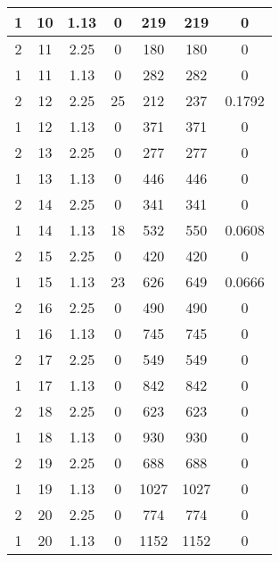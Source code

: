\documentclass[letterpaper, 12pt]{article}
\begin{document}
\begin{longtable}{|c|c|c|c|c|c|c|}
\hline
1 & 10 & 1.13 & 0 & 219 & 219 & 0 \\
\hline
2 & 11 & 2.25 & 0 & 180 & 180 & 0 \\
\hline
1 & 11 & 1.13 & 0 & 282 & 282 & 0 \\
\hline
2 & 12 & 2.25 & 25 & 212 & 237 & 0.1792 \\
\hline
1 & 12 & 1.13 & 0 & 371 & 371 & 0 \\
\hline
2 & 13 & 2.25 & 0 & 277 & 277 & 0 \\
\hline
1 & 13 & 1.13 & 0 & 446 & 446 & 0 \\
\hline
2 & 14 & 2.25 & 0 & 341 & 341 & 0 \\
\hline
1 & 14 & 1.13 & 18 & 532 & 550 & 0.0608 \\
\hline
2 & 15 & 2.25 & 0 & 420 & 420 & 0 \\
\hline
1 & 15 & 1.13 & 23 & 626 & 649 & 0.0666 \\
\hline
2 & 16 & 2.25 & 0 & 490 & 490 & 0 \\
\hline
1 & 16 & 1.13 & 0 & 745 & 745 & 0 \\
\hline
2 & 17 & 2.25 & 0 & 549 & 549 & 0 \\
\hline
1 & 17 & 1.13 & 0 & 842 & 842 & 0 \\
\hline
2 & 18 & 2.25 & 0 & 623 & 623 & 0 \\
\hline
1 & 18 & 1.13 & 0 & 930 & 930 & 0 \\
\hline
2 & 19 & 2.25 & 0 & 688 & 688 & 0 \\
\hline
1 & 19 & 1.13 & 0 & 1027 & 1027 & 0 \\
\hline
2 & 20 & 2.25 & 0 & 774 & 774 & 0 \\
\hline
1 & 20 & 1.13 & 0 & 1152 & 1152 & 0 \\
\hline
\end{longtable}
\end{document}
